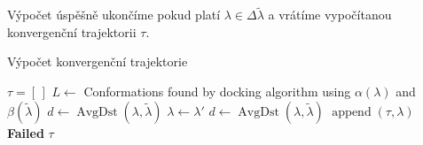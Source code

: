 Výpočet úspěšně ukončíme pokud platí $\lambda \in \Delta\tilde{\lambda}$ a
vrátíme vypočítanou konvergenční trajektorii $ \tau $.

\begin{algorithm}
\caption{Výpočet konvergenční trajektorie}
\label{alg:convergence}
\begin{algorithmic}[1]

    \State $ \tau = [\,] $
    \While {$\lambda \not\in \Delta\tilde{\lambda}$}
        \State $ L \gets $ Conformations found by docking algorithm using $ \alpha(\lambda) $
            and $ \beta(\tilde{\lambda})$ \label{alg:convergence:docking}
        \State $ d \gets \operatorname{AvgDst}(\lambda, \tilde{\lambda}) $
             \label{alg:convergence:feasibility}
                 \label{alg:convergence:best}
                    \State $ \lambda \gets \lambda' $
                \EndIf
            \EndIf
        \EndFor
         \label{alg:convergence:progress}
            \State $d \gets \operatorname{AvgDst}(\lambda, \tilde{\lambda}) $
            \State $ \operatorname{append}(\tau, \lambda) $
        \Else
            \State \Return \textbf{Failed}
        \EndIf
    \EndWhile
    \State \Return $\tau$
\EndFunction


\end{algorithmic}
\end{algorithm}
